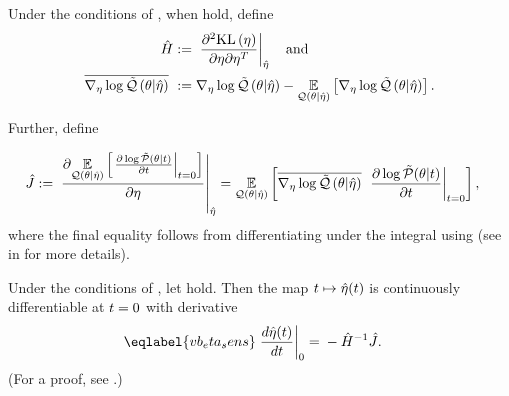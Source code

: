 \begin{defn}
%
Under the conditions of , when  hold, define
%
\begin{align*}
%
\hessopt :={}& \fracat{\partial^2 \KL{\eta}}
                      {\partial \eta \partial \eta^T}
                      {\etaopt} \mathand \\
%
\lqgradbar{\theta \vert \etaopt} :={}&
    \lqgrad{\theta \vert \etaopt} -
    \expect{\q(\theta \vert \etaopt)}{\lqgrad{\theta \vert \etaopt}}.
%
\end{align*}


Further, define

\begin{align*}
%
\crosshessian :={}&
    \fracat{\partial
            \expect{\q(\theta \vert \etaopt)}
                   {\fracat{\partial \log \ptil(\theta \vert \t)}
                           {\partial \t}{\t=0} }
            }
        {\partial \eta}{\etaopt}
={}
    \expect{\q(\theta \vert \etaopt)}{
          \lqgradbar{\theta \vert \etaopt}
          \fracat{\partial \log \ptil(\theta \vert \t)}
                 {\partial \t}{\t=0}},
%
\end{align*}
%
where the final equality follows from differentiating under the integral using
 (see  in  for
more details).
%
\end{defn}


\begin{thm}
%
Under the conditions of , let
 hold.   Then the map $t \mapsto
\hat\eta(t)$ is continuously differentiable at $t=0$ with derivative
%
\begin{align}\eqlabel{vb_eta_sens}
%
\fracat{d \etaopt(\t)}{d \t}{0} ={}&
    - \hessopt^{-1} \crosshessian.
%
\end{align}
%
(For a proof, see  .)
%
\end{thm}

